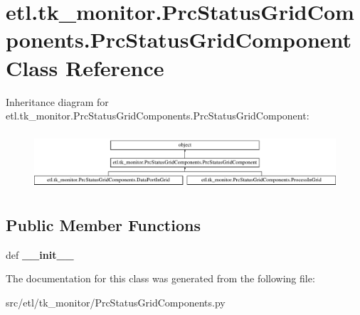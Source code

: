\hypertarget{classetl_1_1tk__monitor_1_1PrcStatusGridComponents_1_1PrcStatusGridComponent}{\section{etl.\-tk\-\_\-monitor.\-Prc\-Status\-Grid\-Components.\-Prc\-Status\-Grid\-Component Class Reference}
\label{classetl_1_1tk__monitor_1_1PrcStatusGridComponents_1_1PrcStatusGridComponent}
}
Inheritance diagram for etl.\-tk\-\_\-monitor.\-Prc\-Status\-Grid\-Components.\-Prc\-Status\-Grid\-Component\-:\begin{figure}[H]
\begin{center}
\leavevmode
\includegraphics[height=2.153846cm]{classetl_1_1tk__monitor_1_1PrcStatusGridComponents_1_1PrcStatusGridComponent}
\end{center}
\end{figure}
\subsection*{Public Member Functions}
\begin{DoxyCompactItemize}
\item 
\hypertarget{classetl_1_1tk__monitor_1_1PrcStatusGridComponents_1_1PrcStatusGridComponent_afed3970b9f7beb4d6bf64438adc09b22}{def {\bfseries \-\_\-\-\_\-init\-\_\-\-\_\-}}\label{classetl_1_1tk__monitor_1_1PrcStatusGridComponents_1_1PrcStatusGridComponent_afed3970b9f7beb4d6bf64438adc09b22}

\end{DoxyCompactItemize}


The documentation for this class was generated from the following file\-:\begin{DoxyCompactItemize}
\item 
src/etl/tk\-\_\-monitor/Prc\-Status\-Grid\-Components.\-py\end{DoxyCompactItemize}
